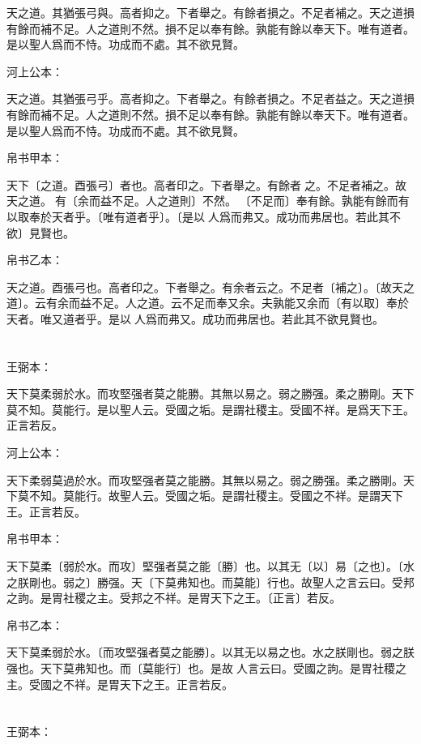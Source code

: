 \documentclass[a5paper]{ctexbook}
\begin{document}
    天之道。其猶張弓與。高者抑之。下者舉之。有餘者損之。不足者補之。天之道損有餘而補不足。人之道則不然。損不足以奉有餘。孰能有餘以奉天下。唯有道者。是以聖人爲而不恃。功成而不處。其不欲見賢。

    河上公本：

    天之道。其猶張弓乎。高者抑之。下者舉之。有餘者損之。不足者益之。天之道損有餘而補不足。人之道則不然。損不足以奉有餘。孰能有餘以奉天下。唯有道者。是以聖人爲而不恃。功成而不處。其不欲見賢。

    帛书甲本：

    天下〔之道。酉張弓〕者也。高者印之。下者舉之。有餘者𢿃之。不足者補之。故天之道。𢿃有〔余而益不足。人之道則〕不然。𢿃〔不足而〕奉有餘。孰能有餘而有以取奉於天者乎。〔唯有道者乎〕。〔是以𦔻人爲而弗又。成功而弗居也。若此其不欲〕見賢也。

    帛书乙本：

    天之道。酉張弓也。高者印之。下者舉之。有余者云之。不足者〔補之〕。〔故天之道〕。云有余而益不足。人之道。云不足而奉又余。夫孰能又余而〔有以取〕奉於天者。唯又道者乎。是以𦔻人爲而弗又。成功而弗居也。若此其不欲見賢也。

    \chapter{}
    王弼本：

    天下莫柔弱於水。而攻堅强者莫之能勝。其無以易之。弱之勝强。柔之勝剛。天下莫不知。莫能行。是以聖人云。受國之垢。是謂社稷主。受國不祥。是爲天下王。正言若反。

    河上公本：

    天下柔弱莫過於水。而攻堅强者莫之能勝。其無以易之。弱之勝强。柔之勝剛。天下莫不知。莫能行。故聖人云。受國之垢。是謂社稷主。受國之不祥。是謂天下王。正言若反。

    帛书甲本：

    天下莫柔〔弱於水。而攻〕堅强者莫之能〔勝〕也。以其无〔以〕易〔之也〕。〔水之朕剛也。弱之〕勝强。天〔下莫弗知也。而莫能〕行也。故聖人之言云曰。受邦之訽。是胃社稷之主。受邦之不祥。是胃天下之王。〔正言〕若反。

    帛书乙本：

    天下莫柔弱於水。〔而攻堅强者莫之能勝〕。以其无以易之也。水之朕剛也。弱之朕强也。天下莫弗知也。而〔莫能行〕也。是故𦔻人言云曰。受國之訽。是胃社稷之主。受國之不祥。是胃天下之王。正言若反。

    \chapter{}
    王弼本：
\end{document}
